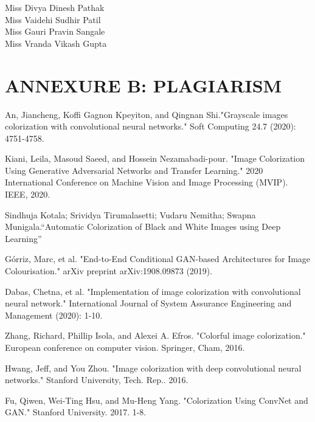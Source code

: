 \documentclass[12pt]{report}	%
\begin{document}
\vspace{0.5in}
{\small\hspace*{3.3 in} Miss Divya Dinesh Pathak\\ \hspace*{3.5 in} Miss Vaidehi Sudhir Patil\\ \hspace*{3.5 in} Miss Gauri Pravin Sangale\\ \hspace*{3.5 in}  Miss Vranda Vikash Gupta\\}


\chapter*{ANNEXURE B: PLAGIARISM}
\label{Appendix B}



%
\newpage

\begin{thebibliography}{99}

An, Jiancheng, Koffi Gagnon Kpeyiton, and Qingnan Shi."Grayscale images colorization with convolutional neural networks." Soft Computing 24.7 (2020): 4751-4758.

 Kiani, Leila, Masoud Saeed, and Hossein Nezamabadi-pour. "Image Colorization Using Generative Adversarial Networks and Transfer Learning." 2020 International Conference on Machine Vision and Image Processing (MVIP). IEEE, 2020.

Sindhuja Kotala;  Srividya Tirumalasetti; Vudaru Nemitha; Swapna Munigala.“Automatic Colorization of Black and White Images using Deep Learning”

Górriz, Marc, et al. "End-to-End Conditional GAN-based Architectures for Image Colourisation." arXiv preprint arXiv:1908.09873 (2019).

Dabas, Chetna, et al. "Implementation of image colorization with convolutional neural network." International Journal of System Assurance Engineering and Management (2020): 1-10.

Zhang, Richard, Phillip Isola, and Alexei A. Efros. "Colorful image colorization." European conference on computer vision. Springer, Cham, 2016.

Hwang, Jeff, and You Zhou. "Image colorization with deep convolutional neural networks." Stanford University, Tech. Rep.. 2016.

Fu, Qiwen, Wei-Ting Hsu, and Mu-Heng Yang. "Colorization Using ConvNet and GAN." Stanford University. 2017. 1-8.

\end{thebibliography}

\newpage
\end{document}
